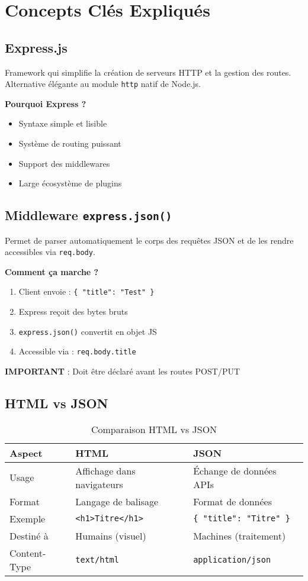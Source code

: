 \documentclass[12pt,a4paper]{article}
\begin{document}
\section{Concepts Clés Expliqués}

\subsection{Express.js}
Framework qui simplifie la création de serveurs HTTP et la gestion des routes. Alternative élégante au module \texttt{http} natif de Node.js.

\textbf{Pourquoi Express ?}
\begin{itemize}
    \item Syntaxe simple et lisible
    \item Système de routing puissant
    \item Support des middlewares
    \item Large écosystème de plugins
\end{itemize}

\subsection{Middleware \texttt{express.json()}}
Permet de parser automatiquement le corps des requêtes JSON et de les rendre accessibles via \texttt{req.body}.

\textbf{Comment ça marche ?}
\begin{enumerate}
    \item Client envoie : \texttt{\{ "title": "Test" \}}
    \item Express reçoit des bytes bruts
    \item \texttt{express.json()} convertit en objet JS
    \item Accessible via : \texttt{req.body.title}
\end{enumerate}

\textbf{IMPORTANT} : Doit être déclaré avant les routes POST/PUT

\subsection{HTML vs JSON}

\begin{table}[h!]
\centering
\begin{tabular}{@{}lll@{}}
\toprule
\textbf{Aspect} & \textbf{HTML} & \textbf{JSON} \\
\midrule
Usage & Affichage dans navigateurs & Échange de données APIs \\
Format & Langage de balisage & Format de données \\
Exemple & \texttt{<h1>Titre</h1>} & \texttt{\{ "title": "Titre" \}} \\
Destiné à & Humains (visuel) & Machines (traitement) \\
Content-Type & \texttt{text/html} & \texttt{application/json} \\
\bottomrule
\end{tabular}
\caption{Comparaison HTML vs JSON}
\end{table}
\end{document}
